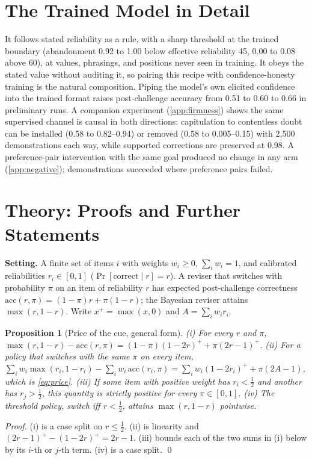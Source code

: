 \documentclass{article}
\newtheorem{proposition}{Proposition}
\begin{document}
\section{The Trained Model in Detail}
\label{app:repairdetail}
It follows stated reliability as a rule, with a sharp threshold at the trained boundary (abandonment 0.92 to 1.00 below effective reliability 45, 0.00 to 0.08 above 60), at values, phrasings, and positions never seen in training. It obeys the stated value without auditing it, so pairing this recipe with confidence-honesty training \citep{tian2023just} is the natural composition. Piping the model's own elicited confidence into the trained format raises post-challenge accuracy from 0.51 to 0.60 to 0.66 in preliminary runs. A companion experiment (\cref{app:firmness}) shows the same supervised channel is causal in both directions: capitulation to contentless doubt can be installed (0.58 to 0.82--0.94) or removed (0.58 to 0.005--0.15) with 2{,}500 demonstrations each way, while supported corrections are preserved at 0.98. A preference-pair intervention with the same goal produced no change in any arm (\cref{app:negative}); demonstrations succeeded where preference pairs failed.

\section{Theory: Proofs and Further Statements}
\label{app:theory}
\textbf{Setting.} A finite set of items $i$ with weights $w_i\geq 0$, $\sum_i w_i=1$, and calibrated reliabilities $r_i\in[0,1]$ ($\Pr[\text{correct}\mid r]=r$). A reviser that switches with probability $\pi$ on an item of reliability $r$ has expected post-challenge correctness $\mathrm{acc}(r,\pi)=(1-\pi)r+\pi(1-r)$; the Bayesian reviser attains $\max(r,1-r)$. Write $x^{+}=\max(x,0)$ and $A=\sum_i w_i r_i$.

\begin{proposition}[Price of the cue, general form]\label{prop:price-general}
(i) For every $r$ and $\pi$, $\max(r,1-r)-\mathrm{acc}(r,\pi)=(1-\pi)(1-2r)^{+}+\pi(2r-1)^{+}$. (ii) For a policy that switches with the same $\pi$ on every item, $\sum_i w_i\max(r_i,1-r_i)-\sum_i w_i\,\mathrm{acc}(r_i,\pi)=\sum_i w_i(1-2r_i)^{+}+\pi(2A-1)$, which is \cref{eq:price}. (iii) If some item with positive weight has $r_i<\tfrac12$ and another has $r_j>\tfrac12$, this quantity is strictly positive for every $\pi\in[0,1]$. (iv) The threshold policy, switch iff $r<\tfrac12$, attains $\max(r,1-r)$ pointwise.
\end{proposition}
\emph{Proof.} (i) is a case split on $r\leq\tfrac12$. (ii) is linearity and $(2r-1)^{+}-(1-2r)^{+}=2r-1$. (iii) bounds each of the two sums in (i) below by its $i$-th or $j$-th term. (iv) is a case split. \qed
\end{document}
